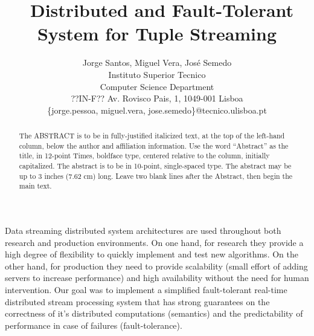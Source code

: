 \documentclass[times, 10pt,twocolumn]{article}
\begin{document}
\title{\ Distributed and Fault-Tolerant System for Tuple
Streaming}

			 \author{Jorge Santos, Miguel Vera, Jos\'e Semedo \\
				 Instituto Superior Tecnico\\ Computer Science
				 Department\\ ??IN-F??  Av. Rovisco Pais, 1,
				 1049-001 Lisboa\\ \{jorge.pessoa, miguel.vera,
				 jose.semedo\}@tecnico.ulisboa.pt }

\maketitle \thispagestyle{empty}

\begin{abstract} The ABSTRACT is to be in fully-justified
	italicized text, at the top of the left-hand column, below
	the author and affiliation information.  Use the word
	``Abstract'' as the title, in 12-point Times, boldface
	type, centered relative to the column, initially
	capitalized. The abstract is to be in 10-point,
	single-spaced type.  The abstract may be up to 3 inches
	(7.62 cm) long. Leave two blank lines after the Abstract,
	then begin the main text.  \end{abstract}




	Data streaming distributed system architectures are used 
throughout both research and production environments. On one
hand, for research they provide a high degree of flexibility to 
quickly implement and test new algorithms. On the other
hand, for production they need to provide scalability (small effort 
of adding servers to increase performance) and high availability 
without the need for human intervention. Our goal was to implement
a simplified fault-tolerant real-time distributed stream processing 
system that has strong guarantees on the correctness of 
it's distributed computations (semantics) and the predictability of performance 
in case of failures (fault-tolerance).
\end{document}
